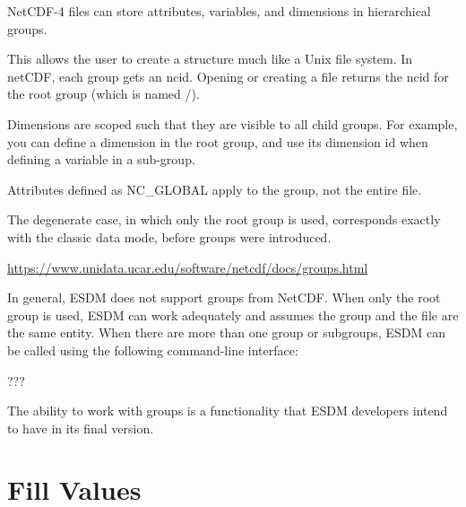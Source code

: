 \tab
\begin{framed}

NetCDF-4 files can store attributes, variables, and dimensions in hierarchical groups.

This allows the user to create a structure much like a Unix file system. In netCDF, each group gets an ncid. Opening or creating a file returns the ncid for the root group (which is named /).

Dimensions are scoped such that they are visible to all child groups. For example, you can define a dimension in the root group, and use its dimension id when defining a variable in a sub-group.

Attributes defined as NC\_GLOBAL apply to the group, not the entire file.

The degenerate case, in which only the root group is used, corresponds exactly with the classic data mode, before groups were introduced.

\url{https://www.unidata.ucar.edu/software/netcdf/docs/groups.html}

\end{framed}

In general, ESDM does not support groups from NetCDF. When only the root group is used, ESDM can work adequately and assumes the group and the file are the same entity. When there are more than one group or subgroups, ESDM can be called using the following command-line interface:

???

The ability to work with groups is a functionality that ESDM developers intend to have in its final version.

\section{Fill Values}

